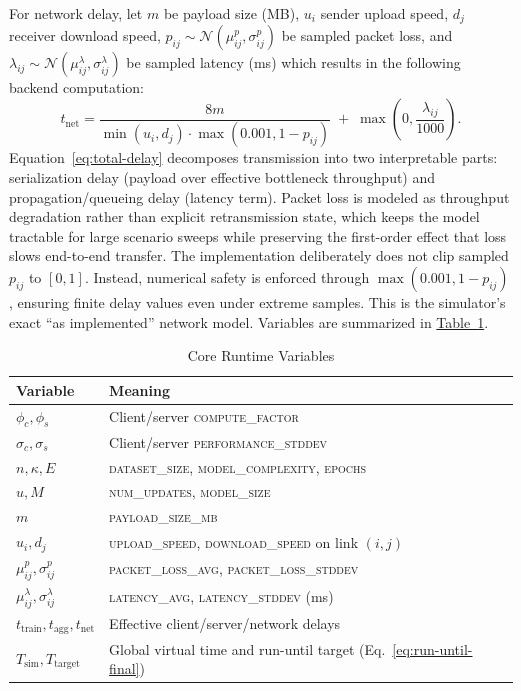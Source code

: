 \documentclass[conference]{IEEEtran}
\newcommand{\tabref}[1]{\hyperref[#1]{Table~\ref*{#1}}}
\begin{document}
For network delay, let $m$ be payload size (MB), $u_i$ sender upload speed, $d_j$ receiver download speed, $p_{ij}\sim\mathcal{N}(\mu^p_{ij},\sigma^p_{ij})$ be sampled packet loss, and $\lambda_{ij}\sim\mathcal{N}(\mu^\lambda_{ij},\sigma^\lambda_{ij})$ be sampled latency (ms) which results in the following backend computation:
\begin{equation}
t_{\mathrm{net}}=
\frac{8m}{\min(u_i,d_j)\cdot\max(0.001,1-p_{ij})}
\;+\;\max\!\left(0,\frac{\lambda_{ij}}{1000}\right).
\label{eq:total-delay}
\end{equation}
Equation~\ref{eq:total-delay} decomposes transmission into two interpretable parts: serialization delay (payload over effective bottleneck throughput) and propagation/queueing delay (latency term). Packet loss is modeled as throughput degradation rather than explicit retransmission state, which keeps the model tractable for large scenario sweeps while preserving the first-order effect that loss slows end-to-end transfer. The implementation deliberately does not clip sampled $p_{ij}$ to $[0,1]$. Instead, numerical safety is enforced through $\max(0.001,1-p_{ij})$, ensuring finite delay values even under extreme samples.
This is the simulator's exact ``as implemented'' network model. Variables are summarized in \tabref{tab:runtime-symbols}.

\begin{table}[t]
\caption{Core Runtime Variables}
\label{tab:runtime-symbols}
\centering
{\setlength{\tabcolsep}{5.5pt}
\renewcommand{\arraystretch}{1.35}
\begin{tabular}{|l|l|}
\hline
\textbf{Variable} & \textbf{Meaning} \\
\hline
$\phi_c,\phi_s$ & Client/server \textsc{compute\_factor} \\
\hline
$\sigma_c,\sigma_s$ & Client/server \textsc{performance\_stddev} \\
\hline
$n,\kappa, E$ & \textsc{dataset\_size}, \textsc{model\_complexity},
 \textsc{epochs} \\
\hline
$u,M$ & \textsc{num\_updates}, \textsc{model\_size} \\
\hline
$m$ & \textsc{payload\_size\_mb} \\
\hline
$u_i,d_j$ & \textsc{upload\_speed}, \textsc{download\_speed} on link $(i,j)$ \\
\hline
$\mu^p_{ij},\sigma^p_{ij}$ & \textsc{packet\_loss\_avg}, \textsc{packet\_loss\_stddev} \\
\hline
$\mu^\lambda_{ij},\sigma^\lambda_{ij}$ & \textsc{latency\_avg}, \textsc{latency\_stddev} (ms) \\
\hline
$t_{\mathrm{train}},t_{\mathrm{agg}},t_{\mathrm{net}}$ & Effective client/server/network delays \\
\hline
$T_{\mathrm{sim}},T_{\mathrm{target}}$ & Global virtual time and run-until target (Eq.~\ref{eq:run-until-final}) \\
\hline
\end{tabular}
}
\end{table}
\end{document}

